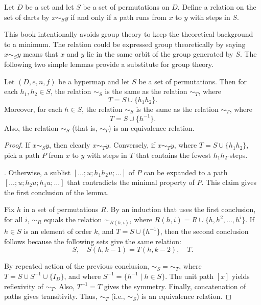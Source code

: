 \begin{definition}[$\sim_S$]
Let $D$ be a set and let $S$ be a 
set of permutations on $D$.
Define a relation on the set of darts by $x\sim_S y$ if and only if  a
path runs from $x$ to $y$ with steps in $S$.
\end{definition}
%

This book intentionally avoids group theory to keep the theoretical
background to a minimum.  The relation could be expressed group
theoretically by saying $x\sim_S y$ means that $x$ and $y$ lie in the
same orbit of the group generated by $S$.  The following two simple
lemmas provide a substitute for group theory.

\begin{lemma}\label{lemma:er} %
Let $(D,e,n,f)$ be a hypermap and let $S$ be a  set of permutations.
Then for each $h_1,h_2\in S$, 
the relation $\sim_S$ is the same as the relation $\sim_T$, where
\[ 
T = S \cup \{h_1h_2\}.
\] 
Moreover, for each $h\in S$, 
the relation $\sim_S$ is the same as the relation $\sim_T$, where
\[ 
T = S \cup \{h^{-1}\}.
\] 
Also,  the relation $\sim_S$ (that is, $\sim_T$) is an equivalence relation.  
%
\end{lemma}

\begin{proof} If $x\sim_S y$, then clearly $x\sim_T y$.  Conversely, if
  $x\sim_T y$, where $T = S\cup\{h_1h_2\}$, pick a path $P$ from $x$
  to $y$ with steps in $T$ that contains the fewest $h_1h_2$-steps.

  .  Otherwise, a
  sublist $[\ldots;u;h_1h_2u;\ldots]$ of $P$ can be expanded to a path
  $[\ldots;u;h_2u;h_1u;\ldots]$ that contradicts the minimal property
  of $P$. This claim gives the first conclusion of the lemma.

 Fix $h$ in a set of
permutations $R$.  By an induction that uses the first conclusion, for
all $i$, $\sim_R$ equals the relation $\sim_{R(h,i)}$, where $R(h,i) =
R \cup \{h,h^2,\ldots,h^i\}$.  If $h\in S$ is an element of order $k$,
and $T = S\cup\{h^{-1}\}$, then the second conclusion follows because
the following sets give the same relation:
\[ 
S,\quad S(h,k-1) = T(h,k-2),\quad T.
\] 

By repeated action of the previous conclusion, $\sim_S=\sim_T$, where
$T = S\cup S^{-1}\cup \{I_D\}$, and where $S^{-1} = \{h^{-1}\mid h\in
S\}$.  The unit path $[x]$ yields reflexivity of $\sim_T$.  Also,
$T^{-1} = T$ gives the symmetry.  Finally, concatenation of paths
gives transitivity.  Thus, $\sim_T$ (i.e., $\sim_S$) is an equivalence
relation.
\end{proof}

